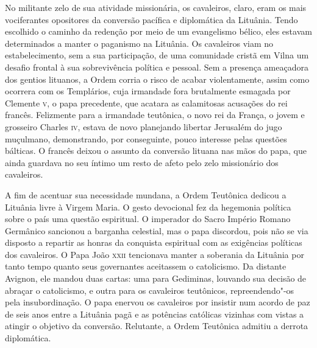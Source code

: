 No militante zelo de sua atividade missionária, os cavaleiros, claro,
eram os mais vociferantes opositores da conversão pacífica e diplomática
da Lituânia. Tendo escolhido o caminho da redenção por meio de um
evangelismo bélico, eles estavam determinados a manter o paganismo na
Lituânia. Os cavaleiros viam no estabelecimento, sem a sua participação,
de uma comunidade cristã em Vilna um desafio frontal à sua sobrevivência
política e pessoal. Sem a presença ameaçadora dos gentios lituanos, a
Ordem corria o risco de acabar violentamente, assim como ocorrera com os
Templários, cuja irmandade fora brutalmente esmagada por Clemente \textsc{v}, o
papa precedente, que acatara as calamitosas acusações do rei francês.
Felizmente para a irmandade teutônica, o novo rei da França, o jovem e
grosseiro Charles \textsc{iv}, estava de novo planejando libertar Jerusalém do
jugo muçulmano, demonstrando, por conseguinte, pouco interesse pelas
questões bálticas. O francês deixou o assunto da conversão lituana nas
mãos do papa, que ainda guardava no seu íntimo um resto de afeto pelo
zelo missionário dos cavaleiros.

A fim de acentuar sua necessidade mundana, a Ordem Teutônica dedicou a
Lituânia livre à Virgem Maria. O gesto devocional fez da hegemonia
política sobre o país uma questão espiritual. O imperador do Sacro
Império Romano Germânico sancionou a barganha celestial, mas o papa
discordou, pois não se via disposto a repartir as honras da conquista
espiritual com as exigências políticas dos cavaleiros. O Papa João \textsc{xxii}
tencionava manter a soberania da Lituânia por tanto tempo quanto seus
governantes aceitassem o catolicismo. Da distante Avignon, ele mandou
duas cartas: uma para Gediminas, louvando sua decisão de abraçar o
catolicismo, e outra para os cavaleiros teutônicos, repreendendo"-os pela
insubordinação. O papa enervou os cavaleiros por insistir num acordo de
paz de seis anos entre a Lituânia pagã e as potências católicas vizinhas
com vistas a atingir o objetivo da conversão. Relutante, a Ordem
Teutônica admitiu a derrota diplomática.

